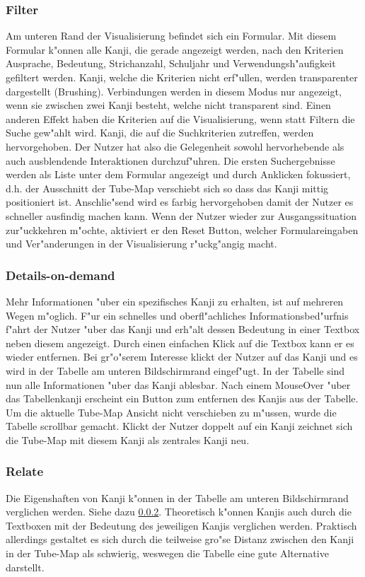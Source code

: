 \subsubsection{Filter}\label{Filter}
Am unteren Rand der Visualisierung befindet sich ein Formular. Mit diesem Formular k"onnen alle Kanji, die gerade angezeigt werden, nach den Kriterien Ausprache, Bedeutung, Strichanzahl, Schuljahr und Verwendungsh"aufigkeit gefiltert werden. Kanji, welche die Kriterien nicht erf"ullen, werden transparenter dargestellt (Brushing). Verbindungen werden in diesem Modus nur angezeigt, wenn sie zwischen zwei Kanji besteht, welche nicht transparent sind. Einen anderen Effekt haben die Kriterien auf die Visualisierung, wenn statt Filtern die Suche gew"ahlt wird. Kanji, die auf die Suchkriterien zutreffen, werden hervorgehoben. Der Nutzer hat also die Gelegenheit sowohl hervorhebende als auch ausblendende Interaktionen durchzuf"uhren. Die ersten Suchergebnisse werden als Liste unter dem Formular angezeigt und durch Anklicken fokussiert, d.h. der Ausschnitt der Tube-Map verschiebt sich so dass das Kanji mittig positioniert ist. Anschlie"send  wird es farbig hervorgehoben damit der Nutzer es schneller ausfindig machen kann. Wenn der Nutzer wieder zur Ausgangssituation zur"uckkehren m"ochte, aktiviert er den Reset Button, welcher Formulareingaben und Ver"anderungen in der Visualisierung r"uckg"angig macht.

\subsubsection{Details-on-demand}\label{Details-on-demand}
Mehr Informationen "uber ein spezifisches Kanji zu erhalten, ist auf mehreren Wegen m"oglich. F"ur ein schnelles und oberfl"achliches Informationsbed"urfnis f"ahrt der Nutzer "uber das Kanji und erh"alt dessen Bedeutung in einer Textbox neben diesem angezeigt. Durch einen einfachen Klick auf die Textbox kann er es wieder entfernen. Bei gr"o"serem Interesse klickt der Nutzer auf das Kanji und es wird in der Tabelle am unteren Bildschirmrand eingef"ugt. In der Tabelle sind nun alle Informationen "uber das Kanji ablesbar. Nach einem MouseOver "uber das Tabellenkanji erscheint ein Button zum entfernen des Kanjis aus der Tabelle. Um die aktuelle Tube-Map Ansicht nicht verschieben zu m"ussen, wurde die Tabelle scrollbar gemacht. Klickt der Nutzer doppelt auf ein Kanji zeichnet sich die Tube-Map mit diesem Kanji als zentrales Kanji neu. 

\subsubsection{Relate}
Die Eigenshaften von Kanji k"onnen in der Tabelle am unteren Bildschirmrand verglichen werden. Siehe dazu \ref{Details-on-demand}. Theoretisch k"onnen Kanjis auch durch die Textboxen mit der Bedeutung des jeweiligen Kanjis verglichen werden. Praktisch allerdings gestaltet es sich durch die teilweise gro"se Distanz zwischen den Kanji in der Tube-Map als schwierig, weswegen die Tabelle eine gute Alternative darstellt. 

